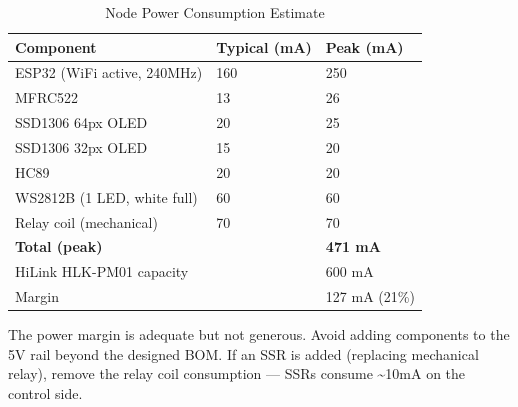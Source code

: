 \begin{table}[H]
\centering
\caption{Node Power Consumption Estimate}
\begin{tabular}{L{5cm}C{3cm}C{3cm}}
\toprule
\textbf{Component} & \textbf{Typical (mA)} & \textbf{Peak (mA)} \\
\midrule
ESP32 (WiFi active, 240MHz) & 160 & 250 \\
MFRC522 & 13 & 26 \\
SSD1306 64px OLED & 20 & 25 \\
SSD1306 32px OLED & 15 & 20 \\
HC89 & 20 & 20 \\
WS2812B (1 LED, white full) & 60 & 60 \\
Relay coil (mechanical) & 70 & 70 \\
\midrule
\textbf{Total (peak)} & & \textbf{471 mA} \\
\midrule
HiLink HLK-PM01 capacity & & 600 mA \\
Margin & & 127 mA (21\%) \\
\bottomrule
\end{tabular}
\end{table}

\begin{notebox}
The power margin is adequate but not generous. Avoid adding components to the 5V rail beyond the designed BOM. If an SSR is added (replacing mechanical relay), remove the relay coil consumption --- SSRs consume \textasciitilde{}10mA on the control side.
\end{notebox}
